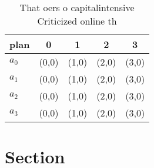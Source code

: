 \documentclass[a4paper]{article}
\begin{document}
\begin{table}
\begin{adjustbox}{width=0.5\columnwidth}
\begin{tabular}{|l|l|l|l|l|}
\hline
\textbf{plan} & \multicolumn{1}{c|}{\textbf{0}} & \multicolumn{1}{c|}{\textbf{1}} & \multicolumn{1}{c|}{\textbf{2}} & \multicolumn{1}{c|}{\textbf{3}} \\ \hline
\textbf{$a_0$}  & (0,0) & (1,0) & (2,0) & (3,0) \\ \hline
\textbf{$a_1$}  & (0,0) & (1,0) & (2,0) & (3,0) \\ \hline
\textbf{$a_2$}  & (0,0) & (1,0) & (2,0) & (3,0) \\ \hline
\textbf{$a_3$}  & (0,0) & (1,0) & (2,0) & (3,0) \\ \hline
\end{tabular}
\end{adjustbox}
\caption{That oers o capitalintensive Criticized online th
}
\end{table}

\section{Section}
\end{document}
